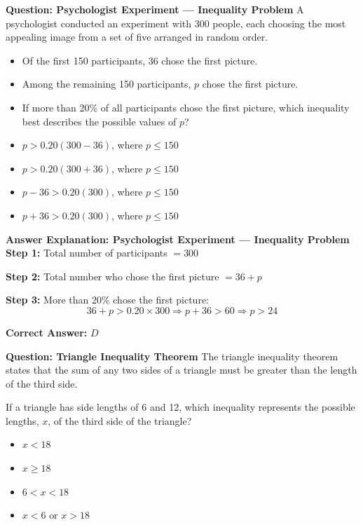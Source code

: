 \documentclass{beamer}
\begin{document}
\begin{frame}{\textbf{Question: Psychologist Experiment — Inequality Problem}}
    \small
    A psychologist conducted an experiment with 300 people, each choosing the most appealing image from a set of five arranged in random order.

    \begin{itemize}
        \item Of the first 150 participants, 36 chose the first picture.
        \item Among the remaining 150 participants, \(p\) chose the first picture.
        \item If more than 20\% of all participants chose the first picture, which inequality best describes the possible values of \(p\)?
    \end{itemize}

    \vspace{0.5em}
    \begin{itemize}
        \item[\textbf{A.}] \(p > 0.20(300 - 36)\), where \(p \leq 150\)
        \item[\textbf{B.}] \(p > 0.20(300 + 36)\), where \(p \leq 150\)
        \item[\textbf{C.}] \(p - 36 > 0.20(300)\), where \(p \leq 150\)
        \item[\textbf{D.}] \(p + 36 > 0.20(300)\), where \(p \leq 150\)
    \end{itemize}
\end{frame}

\begin{frame}{\textbf{Answer Explanation: Psychologist Experiment — Inequality Problem}}
    \small
    \textbf{Step 1:} Total number of participants \(= 300\)

    \textbf{Step 2:} Total number who chose the first picture \(= 36 + p\)

    \textbf{Step 3:} More than 20\% chose the first picture:
    \[
    36 + p > 0.20 \times 300
    \Rightarrow p + 36 > 60
    \Rightarrow p > 24
    \]

    \textbf{Correct Answer:} \( \boxed{D} \)
\end{frame}

\begin{frame}{\textbf{Question: Triangle Inequality Theorem}}
    \small
    The triangle inequality theorem states that the sum of any two sides of a triangle must be greater than the length of the third side.

    If a triangle has side lengths of 6 and 12, which inequality represents the possible lengths, \(x\), of the third side of the triangle?

    \vspace{0.5em}
    \begin{itemize}
        \item[\textbf{A.}] \(x < 18\)
        \item[\textbf{B.}] \(x \geq 18\)
        \item[\textbf{C.}] \(6 < x < 18\)
        \item[\textbf{D.}] \(x < 6 \text{ or } x > 18\)
    \end{itemize}
\end{frame}
\end{document}
